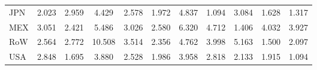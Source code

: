 \begin{table}[htbp]
\begin{tabular}{lcccccccccc}
  JPN & \textcolor[RGB]{212,137,43}{2.023} & \textcolor[RGB]{148,96,107}{2.959} & \textcolor[RGB]{77,50,178}{4.429} & \textcolor[RGB]{189,122,66}{2.578} & \textcolor[RGB]{217,140,38}{1.972} & \textcolor[RGB]{59,38,196}{4.837} & \textcolor[RGB]{250,162,5}{1.094} & \textcolor[RGB]{138,89,117}{3.084} & \textcolor[RGB]{224,145,31}{1.628} & \textcolor[RGB]{245,158,10}{1.317} \\ 
  MEX & \textcolor[RGB]{140,91,115}{3.051} & \textcolor[RGB]{199,129,56}{2.421} & \textcolor[RGB]{51,33,204}{5.486} & \textcolor[RGB]{143,92,112}{3.026} & \textcolor[RGB]{186,120,69}{2.580} & \textcolor[RGB]{38,25,217}{6.320} & \textcolor[RGB]{69,45,186}{4.712} & \textcolor[RGB]{237,153,18}{1.406} & \textcolor[RGB]{84,54,171}{4.032} & \textcolor[RGB]{94,61,161}{3.927} \\ 
  RoW & \textcolor[RGB]{191,124,64}{2.564} & \textcolor[RGB]{173,112,82}{2.772} & \textcolor[RGB]{15,10,240}{10.508} & \textcolor[RGB]{117,76,138}{3.514} & \textcolor[RGB]{201,130,54}{2.356} & \textcolor[RGB]{66,43,189}{4.762} & \textcolor[RGB]{87,56,168}{3.998} & \textcolor[RGB]{54,35,201}{5.163} & \textcolor[RGB]{230,148,26}{1.500} & \textcolor[RGB]{207,134,48}{2.097} \\ 
  USA & \textcolor[RGB]{161,104,94}{2.848} & \textcolor[RGB]{222,144,33}{1.695} & \textcolor[RGB]{99,64,156}{3.880} & \textcolor[RGB]{194,125,61}{2.528} & \textcolor[RGB]{214,139,41}{1.986} & \textcolor[RGB]{92,59,163}{3.958} & \textcolor[RGB]{166,107,89}{2.818} & \textcolor[RGB]{204,132,51}{2.133} & \textcolor[RGB]{219,142,36}{1.915} & \textcolor[RGB]{252,163,3}{1.094} \\ 
   \hline
\end{tabular}
\end{table}
